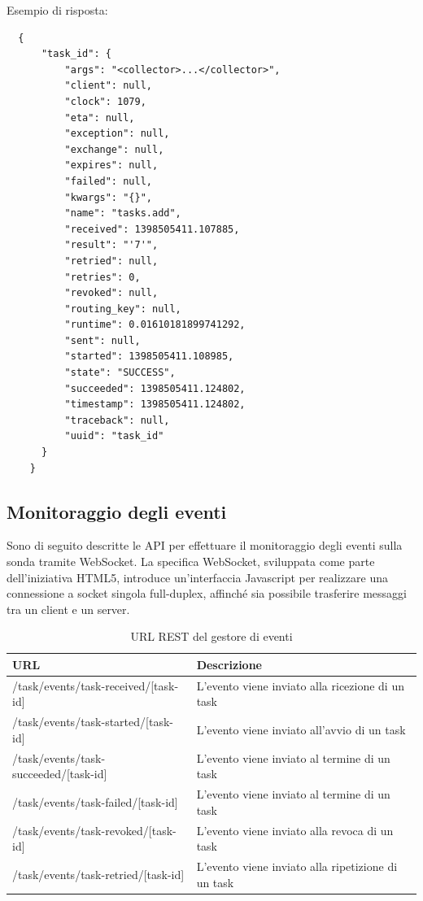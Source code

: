\documentclass[../main.tex]{subfiles}
\begin{document}
Esempio di risposta:
\begin{Verbatim}
  {
      "task_id": {
          "args": "<collector>...</collector>",
          "client": null,
          "clock": 1079,
          "eta": null,
          "exception": null,
          "exchange": null,
          "expires": null,
          "failed": null,
          "kwargs": "{}",
          "name": "tasks.add",
          "received": 1398505411.107885,
          "result": "'7'",
          "retried": null,
          "retries": 0,
          "revoked": null,
          "routing_key": null,
          "runtime": 0.01610181899741292,
          "sent": null,
          "started": 1398505411.108985,
          "state": "SUCCESS",
          "succeeded": 1398505411.124802,
          "timestamp": 1398505411.124802,
          "traceback": null,
          "uuid": "task_id"
      }
    }
\end{Verbatim}

\subsection{Monitoraggio degli eventi}
Sono di seguito descritte le API per effettuare il monitoraggio degli eventi sulla sonda tramite WebSocket.
La specifica WebSocket, sviluppata come parte dell'iniziativa HTML5, introduce un'interfaccia Javascript per realizzare una connessione a socket singola full-duplex, affinché sia possibile trasferire messaggi tra un client e un server\cite{WebSocket}.
\begin{table}[h]
\centering
\begin{tabular}{| m{4.4cm}| m{5cm} | }
\hline
\textbf{URL} & \textbf{Descrizione} \\ \hline
/task/events/task-received/[task-id] & L'evento viene inviato alla ricezione di un task\\ \hline
/task/events/task-started/[task-id] & L'evento viene inviato all'avvio di un task\\ \hline
/task/events/task-succeeded/[task-id] & L'evento viene inviato al termine di un task\\ \hline
/task/events/task-failed/[task-id]  & L'evento viene inviato al termine di un task\\ \hline
/task/events/task-revoked/[task-id] & L'evento viene inviato alla revoca di un task\\ \hline
/task/events/task-retried/[task-id] & L'evento viene inviato alla ripetizione di un task\\ \hline
\end{tabular}
\caption{URL REST del gestore di eventi}
\label{tab:events urls}
\end{table}
\end{document}
